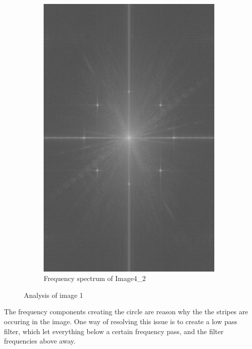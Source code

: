 \begin{figure}[H]
\begin{subfigure}[b]{0.23\textwidth}
        \label{fig:img42_src}
    \end{subfigure}
    \begin{subfigure}[b]{0.23\textwidth}
        \includegraphics[width=\textwidth]{img4/Image4_2_freq_spec.png}
        \caption{Frequency spectrum of Image4\_2}
        \label{fig:img1_hist}
    \end{subfigure}
    \caption{Analysis of image 1}\label{fig:img1}
\end{figure}

The frequency components creating the circle are reason why the the stripes are occuring in the image.  One way of resolving this issue is to create a low pass filter, which let everything below a certain frequency pass, and the filter frequencies above away. \\


